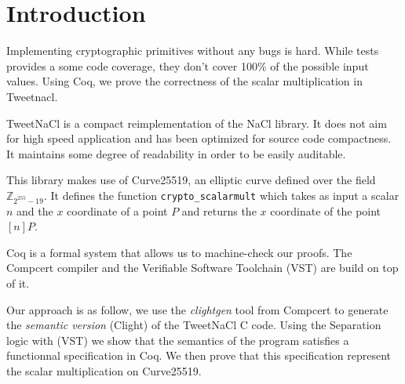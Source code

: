 \section{Introduction}

Implementing cryptographic primitives without any bugs is hard.
While tests provides a some code coverage, they don't cover
100\% of the possible input values. Using Coq, we prove the
correctness of the scalar multiplication in Tweetnacl.

TweetNaCl\cite{BGJ+15} is a compact reimplementation of the
NaCl\cite{BLS12} library. It does not aim for high speed
application and has been optimized for source code compactness.
It maintains some degree of readability in order to be
easily auditable.

This library makes use of Curve25519\cite{Ber06}, an elliptic
curve defined over the field $\mathbb{Z}_{2^{255}-19}$.
It defines the function \texttt{crypto\_scalarmult} which
takes as input a scalar $n$ and the $x$ coordinate of a
point $P$ and returns the $x$ coordinate of the
point $[n]P$.

Coq is a formal system that allows us to machine-check our proofs. The Compcert\cite{Leroy-backend}
compiler and the Verifiable Software Toolchain (VST)\cite{2012-Appel} are build
on top of it.

Our approach is as follow, we use the \textit{clightgen} tool from Compcert to
generate the \textit{semantic version} (Clight\cite{Blazy-Leroy-Clight-09}) of
the TweetNaCl C code. Using the Separation logic\cite{1969-Hoare,Reynolds02separationlogic}
with (VST) we show that the semantics of the program satisfies a functionnal
specification in Coq. We then prove that this specification represent the scalar
multiplication on Curve25519.
